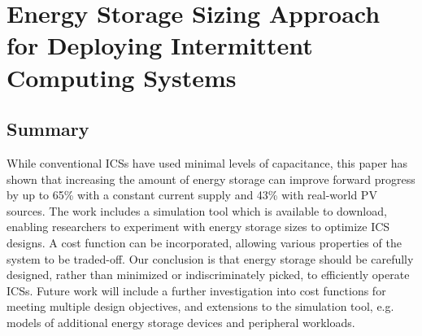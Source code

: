 \chapter{Energy Storage Sizing Approach for Deploying Intermittent Computing Systems}
\label{Chapter:sizingapproach}






\section{Summary}

While conventional ICSs have used minimal levels of capacitance, this paper has shown that increasing the amount of energy storage can improve forward progress by up to 65\% with a constant current supply and 43\% with real-world PV sources. The work includes a simulation tool which is available to download, enabling researchers to experiment with energy storage sizes to optimize ICS designs. A cost function can be incorporated, allowing various properties of the system to be traded-off. Our conclusion is that energy storage should be carefully designed, rather than minimized or indiscriminately picked, to efficiently operate ICSs. Future work will include a further investigation into cost functions for meeting multiple design objectives, and extensions to the simulation tool, e.g. models of additional energy storage devices and peripheral workloads.